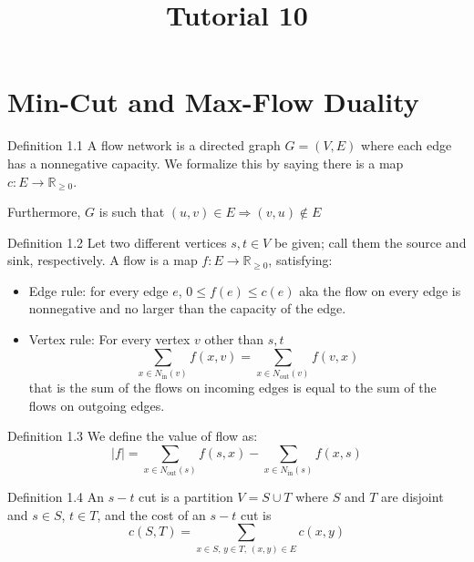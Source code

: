 \documentclass[aspectratio=169]{beamer}
\title{Tutorial 10}
\date{}
\newcommand{\Nin}{N_{\mathrm{in}}}
\newcommand{\Nout}{N_{\mathrm{out}}}
\newcommand{\R}{\mathbb{R}}
\begin{document}
\begin{frame}[plain]
  \titlepage
\end{frame}

\section{Min-Cut and Max-Flow Duality}

\begin{frame}{}
  \begin{block}{Definition 1.1}
    A flow network is a directed graph $G = (V,E)$ where each edge has a nonnegative capacity. We formalize this by saying there is a map $c : E \to \R_{\ge 0}$.

    \medskip
    Furthermore, $G$ is such that $(u,v) \in E \Rightarrow (v,u) \notin E$
  \end{block}
\end{frame}

\begin{frame}{}
  \begin{block}{Definition 1.2}
    Let two different vertices $s,t \in V$ be given; call them the source and sink, respectively. A flow is a map $f : E \to \R_{\ge 0}$, satisfying:
    \begin{itemize}
      \item Edge rule: for every edge $e$, $0 \le f(e) \le c(e)$ aka the flow on every edge is nonnegative and no larger than the capacity of the edge.
      \item Vertex rule: For every vertex $v$ other than $s,t$
      \[
        \sum_{x \in \Nin(v)} f(x,v) = \sum_{x \in \Nout(v)} f(v,x)
      \]
      that is the sum of the flows on incoming edges is equal to the sum of the flows on outgoing edges.
    \end{itemize}
  \end{block}
\end{frame}

\begin{frame}{}
  \begin{block}{Definition 1.3}
    We define the value of flow as:
    \[
      |f| = \sum_{x \in \Nout(s)} f(s,x) - \sum_{x \in \Nin(s)} f(x,s)
    \]
  \end{block}
\end{frame}

\begin{frame}{}
  \begin{block}{Definition 1.4}
    An $s-t$ cut is a partition $V = S \cup T$ where $S$ and $T$ are disjoint and $s \in S$, $t \in T$, and the cost of an $s-t$ cut is
    \[
      c(S,T) = \sum_{x \in S,\, y \in T,\, (x,y) \in E} c(x,y)
    \]
  \end{block}
\end{frame}
\end{document}
